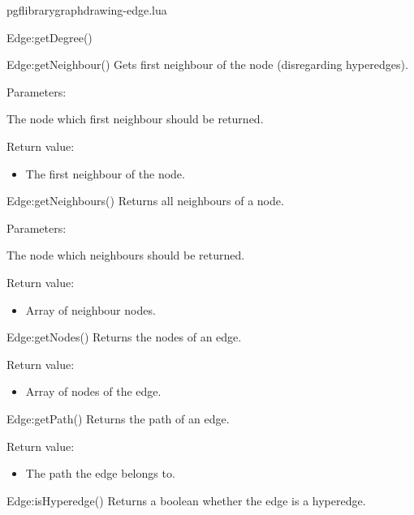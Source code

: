 \begin{filedescription}{pgflibrarygraphdrawing-edge.lua}
\begin{luacommand}{{Edge:getDegree}()}
\end{luacommand}\begin{luacommand}{{Edge:getNeighbour}()}
Gets first neighbour of the node (disregarding hyperedges).

Parameters:
\begin{parameterdescription}
	\item[\meta{node}] The node which first neighbour should be returned.
\end{parameterdescription}


Return value:
\begin{itemize} \item[] The first neighbour of the node. \end{itemize}


\end{luacommand}\begin{luacommand}{{Edge:getNeighbours}()}
Returns all neighbours of a node.

Parameters:
\begin{parameterdescription}
	\item[\meta{node}] The node which neighbours should be returned.
\end{parameterdescription}


Return value:
\begin{itemize} \item[] Array of neighbour nodes. \end{itemize}


\end{luacommand}\begin{luacommand}{{Edge:getNodes}()}
Returns the nodes of an edge.


Return value:
\begin{itemize} \item[] Array of nodes of the edge. \end{itemize}


\end{luacommand}\begin{luacommand}{{Edge:getPath}()}
Returns the path of an edge.


Return value:
\begin{itemize} \item[] The path the edge belongs to. \end{itemize}


\end{luacommand}\begin{luacommand}{{Edge:isHyperedge}()}
Returns a boolean whether the edge is a hyperedge.



\end{luacommand}
\end{filedescription}
